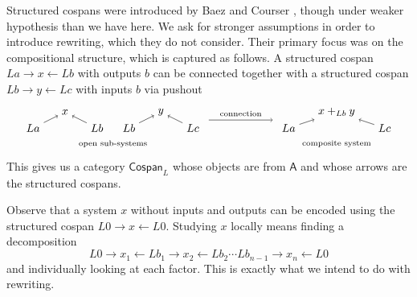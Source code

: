 \documentclass{amsart}
\newcommand{\A}{\cat{A}}
\newcommand{\Csp}{\cat{Cospan}}
\newcommand{\cat}[1]{\mathsf{#1}}
\renewcommand{\gets}{\leftarrow}
\theoremstyle{remark}
\theoremstyle{definition}
\begin{document}
Structured cospans were introduced by Baez and Courser
\cite{StrCsp}, though under weaker hypothesis than we have here.
We ask for stronger assumptions in order to introduce rewriting, which
they do not consider.  Their primary focus was on the compositional
structure, which is captured as follows. A structured cospan
$ La \to x \gets Lb $ with outputs $ b $ can be connected together
with a structured cospan $ Lb \to y \gets Lc $ with inputs $ b $ via
pushout
%
\[
  \begin{tikzpicture}
    \begin{scope}
      \node (1) at (0,0) {$ La $};
      \node (2) at (1,0.5) {$ x $};
      \node (3) at (2,0) {$ Lb $};
      \node (4) at (3,0) {$ Lb $};
      \node (5) at (4,0.5) {$ y $};
      \node (6) at (5,0) {$ Lc $};
      \draw [->] (1) to node [] {\scriptsize{$  $}} (2);
      \draw [->] (3) to node [] {\scriptsize{$  $}} (2);
      \draw [->] (4) to node [] {\scriptsize{$  $}} (5);
      \draw [->] (6) to node [] {\scriptsize{$  $}} (5);
      \node () at (2.5,-0.5) {\scriptsize{open sub-systems}};
    \end{scope}
    \begin{scope}[shift={(8,0)}]
      \node (1) at (0,0) {$ La $};
      \node (2) at (1.5,0.5) {$ x +_{Lb} y $};
      \node (3) at (3,0) {$ Lc $};
      \draw [->] (1) to node [] {\scriptsize{$  $}} (2);
      \draw [->] (3) to node [] {\scriptsize{$  $}} (2);
      \node () at (1.5,-0.5) {\scriptsize{composite system}};
    \end{scope}
    \draw [->] (5.5,0.25) to node [above] {\scriptsize{connection}} (7.5,0.25);    
  \end{tikzpicture}
\]
% 
This gives us a category $ \Csp_L $ whose objects are from $ \A $ and
whose arrows are the structured cospans. 

Observe that a system $ x $ without inputs and outputs can be encoded
using the structured cospan $ L0 \to x \gets L0 $.  Studying $ x $
locally means finding a decomposition
%
\[
  L0 \to x_1 \gets Lb_1 \to x_2 \gets Lb_2 \dotsm Lb_{n-1} \to x_n
  \gets L0
\]
% 
and individually looking at each factor. This is exactly what we
intend to do with rewriting.  
\end{document}
